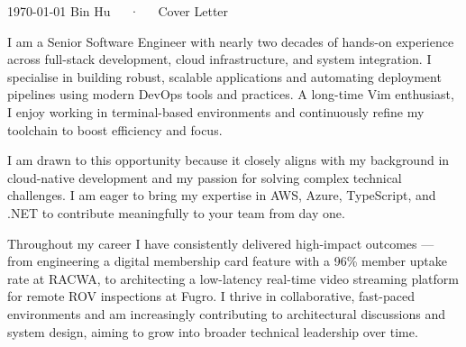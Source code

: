 \documentclass[11pt, a4paper]{awesome-cv}
\begin{document}
\makecvheader[C]

\makecvfooter
  {\today}
  {Bin Hu~~~·~~~Cover Letter}
  {}

\makelettertitle

\begin{cvletter}

I am a Senior Software Engineer with nearly two decades of hands-on experience across full-stack development, cloud infrastructure, and system integration. I specialise in building robust, scalable applications and automating deployment pipelines using modern DevOps tools and practices. A long-time Vim enthusiast, I enjoy working in terminal-based environments and continuously refine my toolchain to boost efficiency and focus.

I am drawn to this opportunity because it closely aligns with my background in cloud-native development and my passion for solving complex technical challenges. I am eager to bring my expertise in AWS, Azure, TypeScript, and .NET to contribute meaningfully to your team from day one.

Throughout my career I have consistently delivered high-impact outcomes — from engineering a digital membership card feature with a 96\% member uptake rate at RACWA, to architecting a low-latency real-time video streaming platform for remote ROV inspections at Fugro. I thrive in collaborative, fast-paced environments and am increasingly contributing to architectural discussions and system design, aiming to grow into broader technical leadership over time.

\end{cvletter}


\makeletterclosing
\end{document}
